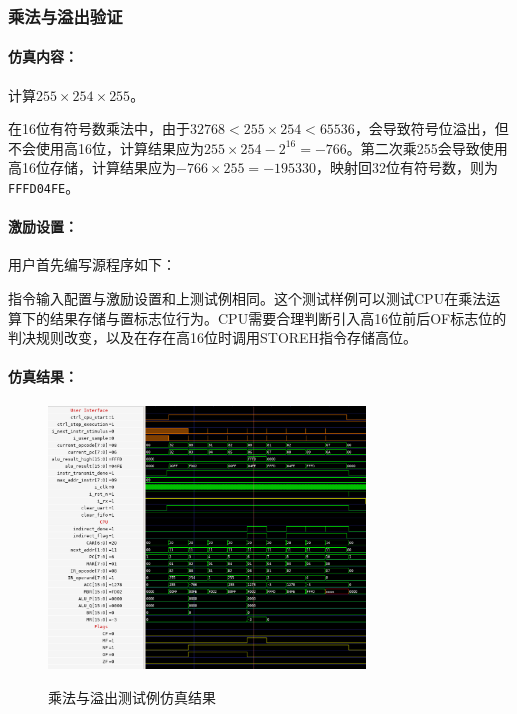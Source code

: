 \documentclass[lang=cn,a4paper,newtx]{elegantpaper}
\begin{document}
\subsubsection{乘法与溢出验证}
\paragraph{仿真内容：}

计算$255\times254\times255$。

在16位有符号数乘法中，由于$32768 < 255\times254 < 65536$，会导致符号位溢出，但不会使用高16位，计算结果应为$255 \times 254 -2 ^{16}= -766$。第二次乘255会导致使用高16位存储，计算结果应为$-766 \times 255 = -195330$，映射回32位有符号数，则为\texttt{FFFD04FE}。 


\paragraph{激励设置：}

用户首先编写源程序如下：


指令输入配置与激励设置和上测试例相同。这个测试样例可以测试CPU在乘法运算下的结果存储与置标志位行为。CPU需要合理判断引入高16位前后OF标志位的判决规则改变，以及在存在高16位时调用STOREH指令存储高位。

\paragraph{仿真结果：}
\begin{figure}[htbp]
  \centering
  \caption{乘法与溢出测试例仿真结果}
  \includegraphics[width = 0.75\textwidth]{figure/cpu_sim_mul.png}
  \label{fig:sim:2}
\end{figure}
\end{document}
